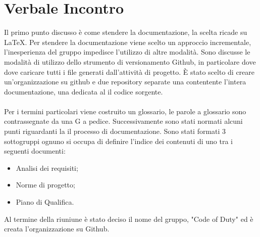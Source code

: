 \section{Verbale Incontro}
	Il primo punto discusso è come stendere la documentazione, la scelta ricade su LaTeX. Per stendere la documentazione viene scelto un approccio incrementale, l'inesperienza del gruppo impedisce l'utilizzo	di altre modalità. Sono discusse le modalità di utilizzo dello strumento di versionamento Github, in particolare dove dove caricare tutti i file generati dall'attività	di progetto. È stato scelto di creare un'organizzazione su github e due repository separate	una contentente l'intera documentazione, una dedicata al il codice sorgente.
	\\ \\ 
	\noindent Per i termini particolari viene costruito un glossario, le parole a glossario sono contrassegnate da una G a pedice.
    Successivamente sono stati normati alcuni punti riguardanti la il processo di documentazione. Sono stati formati 3 sottogruppi ognuno si occupa di definire l'indice dei contenuti di uno tra i seguenti documenti: 
    \begin{itemize}
        \item Analisi dei requisiti;
        \item Norme di progetto;
        \item Piano di Qualifica.
    \end{itemize}	
    
    \noindent Al termine della riuniune è stato deciso il nome del gruppo, "Code of Duty" ed è creata l'organizzazione su Github.